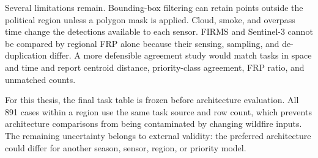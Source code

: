 Several limitations remain. Bounding-box filtering can retain points outside the political region unless a polygon mask is applied. Cloud, smoke, and overpass time change the detections available to each sensor. FIRMS and Sentinel-3 cannot be compared by regional FRP alone because their sensing, sampling, and de-duplication differ. A more defensible agreement study would match tasks in space and time and report centroid distance, priority-class agreement, FRP ratio, and unmatched counts.

For this thesis, the final task table is frozen before architecture evaluation. All 891 cases within a region use the same task source and row count, which prevents architecture comparisons from being contaminated by changing wildfire inputs. The remaining uncertainty belongs to external validity: the preferred architecture could differ for another season, sensor, region, or priority model.
